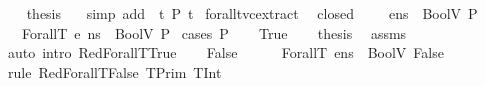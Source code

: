 \begin{isabellebody}
\ \ \isamarkupfalse%
\ {\isacharquery}{\kern0pt}thesis\ \ \isamarkupfalse%
\ {\isacharparenleft}{\kern0pt}simp\ add{\isacharcolon}{\kern0pt}\ {\isacartoucheopen}{\isasymnot}\ {\isacharparenleft}{\kern0pt}{\isasymforall}t{\isachardot}{\kern0pt}\ P\ t{\isacharparenright}{\kern0pt}{\isacartoucheclose}{\isacharparenright}{\kern0pt}\isanewline
{}\isamarkupfalse%
%
\endisatagproof
{\isafoldproof}%
%
\isadelimproof
\isanewline
%
\endisadelimproof
\isanewline
{}\isamarkupfalse%
\ forallt{\isacharunderscore}{\kern0pt}vc{\isacharunderscore}{\kern0pt}extract{\isacharcolon}{\kern0pt}\isanewline
{}\ {\isachardoublequoteopen}{\isasymAnd}{\isasymtau}{\isachardot}{\kern0pt}\ closed\ {\isasymtau}\ {\isasymLongrightarrow}\ {\isasymLambda}{\isacharcomma}{\kern0pt}{\isasymGamma}{\isacharcomma}{\kern0pt}{\isasymtau}{\isacharhash}{\kern0pt}{\isasymOmega}\ {\isasymturnstile}\ {\isasymlangle}e{\isacharcomma}{\kern0pt}ns{\isasymrangle}\ {\isasymDown}\ BoolV\ P{\isachardoublequoteclose}\isanewline
{}\ {\isachardoublequoteopen}{\isasymLambda}{\isacharcomma}{\kern0pt}{\isasymGamma}{\isacharcomma}{\kern0pt}{\isasymOmega}\ {\isasymturnstile}\ {\isasymlangle}ForallT\ e{\isacharcomma}{\kern0pt}\ ns{\isasymrangle}\ {\isasymDown}\ BoolV\ P{\isachardoublequoteclose}\isanewline
%
\isadelimproof
%
\endisadelimproof
%
\isatagproof
{}\isamarkupfalse%
\ {\isacharparenleft}{\kern0pt}cases\ P{\isacharparenright}{\kern0pt}\isanewline
\ \ \isamarkupfalse%
\ True\isanewline
\ \ \isamarkupfalse%
\ {\isacharquery}{\kern0pt}thesis\ \isamarkupfalse%
\ assms\ \isamarkupfalse%
\ {\isacharparenleft}{\kern0pt}auto\ intro{\isacharcolon}{\kern0pt}\ RedForallT{\isacharunderscore}{\kern0pt}True{\isacharparenright}{\kern0pt}\isanewline
{}\isamarkupfalse%
\isanewline
\ \ \isamarkupfalse%
\ False\isanewline
\ \ \isamarkupfalse%
\ {\isachardoublequoteopen}{\isasymLambda}{\isacharcomma}{\kern0pt}{\isasymGamma}{\isacharcomma}{\kern0pt}{\isasymOmega}\ {\isasymturnstile}\ {\isasymlangle}ForallT\ e{\isacharcomma}{\kern0pt}ns{\isasymrangle}\ {\isasymDown}\ BoolV\ False{\isachardoublequoteclose}\isanewline
\ \ \ \ \isamarkupfalse%
\ {\isacharparenleft}{\kern0pt}rule\ RedForallT{\isacharunderscore}{\kern0pt}False{\isacharbrackleft}{\kern0pt}\ {\isacharquery}{\kern0pt}{\isasymtau}{\isacharequal}{\kern0pt}{\isachardoublequoteopen}TPrim\ TInt{\isachardoublequoteclose}{\isacharbrackright}{\kern0pt}{\isacharparenright}{\kern0pt}\isanewline

\end{isabellebody}
